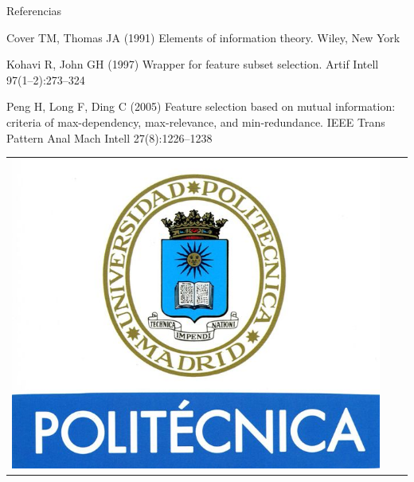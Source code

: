 \documentclass[final]{beamer}
\newlength{\onecolwid}
\begin{document}
\begin{frame}[t]
\begin{columns}[t]
\begin{column}{\onecolwid}
\begin{block}{Referencias}
\begin{thebibliography}{}
Cover TM, Thomas JA (1991) Elements of information theory. Wiley, New York

Kohavi R, John GH (1997) Wrapper for feature subset selection. Artif Intell 97(1–2):273–324

Peng H, Long F, Ding C (2005) Feature selection based on mutual information: criteria of max-dependency, max-relevance, and min-redundance. IEEE Trans Pattern Anal Mach Intell 27(8):1226–1238

\end{thebibliography}

\end{block}



\begin{center}
\begin{tabular}{ccc}
\includegraphics[width=0.4\linewidth]{logoUPM.jpg} 
\end{tabular}
\end{center}


\end{column} %

\end{columns} %

\end{frame} %
\end{document}
